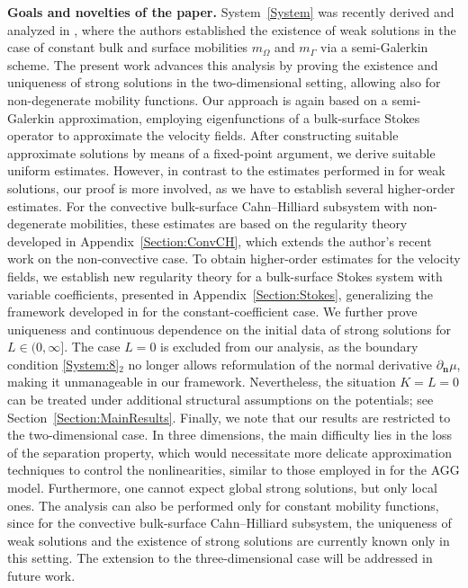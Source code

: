 \documentclass[10pt,reqno]{amsart}
\theoremstyle{remark}
\numberwithin{equation}{section}
\newcommand{\n}{\mathbf{n}}
\newcommand{\deln}{\partial_\n}
\newcommand{\Om}{\Omega}
\newcommand{\Ga}{\Gamma}
\begin{document}
\textbf{Goals and novelties of the paper.}
System~\eqref{System} was recently derived and analyzed in \cite{Knopf2025a}, where the authors established the existence of weak solutions in the case of constant bulk and surface mobilities $m_\Om$ and $m_\Ga$ via a semi-Galerkin scheme.
The present work advances this analysis by proving the existence and uniqueness of strong solutions in the two-dimensional setting, allowing also for non-degenerate mobility functions.
Our approach is again based on a semi-Galerkin approximation, employing eigenfunctions of a bulk-surface Stokes operator to approximate the velocity fields. After constructing suitable approximate solutions by means of a fixed-point argument, we derive suitable uniform estimates. However, in contrast to the estimates performed in \cite{Knopf2025a} for weak solutions, our proof is more involved, as we have to establish several higher-order estimates. For the convective bulk-surface Cahn--Hilliard subsystem with non-degenerate mobilities, these estimates are based on the regularity theory developed in Appendix~\ref{Section:ConvCH}, which extends the author’s recent work \cite{Stange2025} on the non-convective case.
To obtain higher-order estimates for the velocity fields, we establish new regularity theory for a bulk-surface Stokes system with variable coefficients, presented in Appendix~\ref{Section:Stokes}, generalizing the framework developed in \cite[Section~5]{Knopf2025a} for the constant-coefficient case.
We further prove uniqueness and continuous dependence on the initial data of strong solutions for $L\in(0,\infty]$. The case $L = 0$ is excluded from our analysis, as the boundary condition \eqref{System:8}$_2$ no longer allows reformulation of the normal derivative $\deln\mu$, making it unmanageable in our framework. Nevertheless, the situation $K = L = 0$ can be treated under additional structural assumptions on the potentials; see Section~\ref{Section:MainResults}.
Finally, we note that our results are restricted to the two-dimensional case. In three dimensions, the main difficulty lies in the loss of the separation property, which would necessitate more delicate approximation techniques to control the nonlinearities, similar to those employed in \cite{Giorgini2022} for the AGG model. Furthermore, one cannot expect global strong solutions, but only local ones. The analysis can also be performed only for constant mobility functions, since for the convective bulk-surface Cahn--Hilliard subsystem, the uniqueness of weak solutions and the existence of strong solutions are currently known only in this setting. The extension to the three-dimensional case will be addressed in future work.
\end{document}
